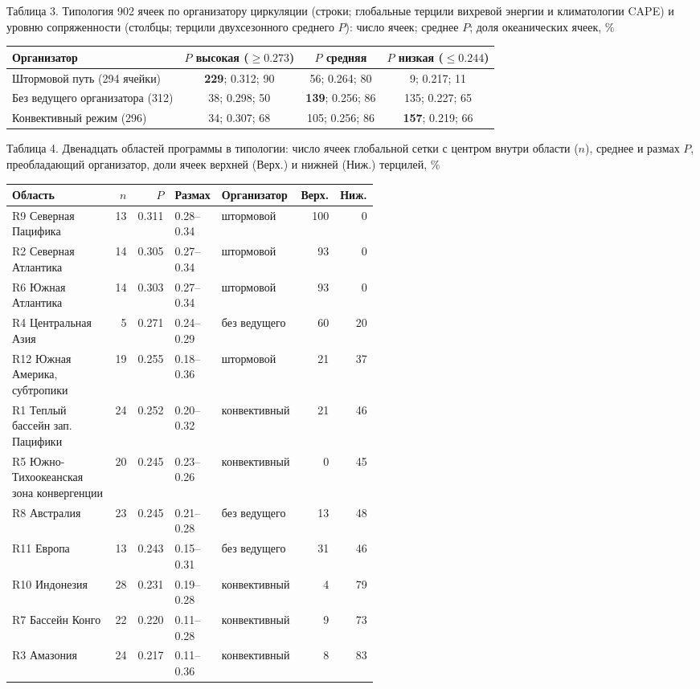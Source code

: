 \documentclass[12pt,a4paper]{article}
\begin{document}
\clearpage
\noindent Таблица 3. Типология 902 ячеек по организатору циркуляции (строки; глобальные терцили вихревой энергии и климатологии CAPE) и уровню сопряженности (столбцы; терцили двухсезонного среднего $P$): число ячеек; среднее $P$; доля океанических ячеек, \%

\begin{singlespace}
\noindent\begin{tabular}{@{}lccc@{}}
\toprule
Организатор & $P$ высокая ($\ge 0.273$) & $P$ средняя & $P$ низкая ($\le 0.244$)\\
\midrule
Штормовой путь (294 ячейки) & \textbf{229}; 0.312; 90 & 56; 0.264; 80 & 9; 0.217; 11\\
Без ведущего организатора (312) & 38; 0.298; 50 & \textbf{139}; 0.256; 86 & 135; 0.227; 65\\
Конвективный режим (296) & 34; 0.307; 68 & 105; 0.256; 86 & \textbf{157}; 0.219; 66\\
\bottomrule
\end{tabular}
\end{singlespace}

\clearpage
\noindent Таблица 4. Двенадцать областей программы в типологии: число ячеек глобальной сетки с центром внутри области ($n$), среднее и размах $P$, преобладающий организатор, доли ячеек верхней (Верх.) и нижней (Ниж.) терцилей, \%

\begin{singlespace}
\noindent\begin{tabular}{@{}>{\raggedright\arraybackslash}p{0.36\linewidth}rrl>{\raggedright\arraybackslash}p{0.17\linewidth}rr@{}}
\toprule
Область & $n$ & $P$ & Размах & Организатор & Верх. & Ниж.\\
\midrule
R9 Северная Пацифика & 13 & 0.311 & 0.28--0.34 & штормовой & 100 & 0\\
R2 Северная Атлантика & 14 & 0.305 & 0.27--0.34 & штормовой & 93 & 0\\
R6 Южная Атлантика & 14 & 0.303 & 0.27--0.34 & штормовой & 93 & 0\\
R4 Центральная Азия & 5 & 0.271 & 0.24--0.29 & без ведущего & 60 & 20\\
R12 Южная Америка, субтропики & 19 & 0.255 & 0.18--0.36 & штормовой & 21 & 37\\
R1 Теплый бассейн зап. Пацифики & 24 & 0.252 & 0.20--0.32 & конвективный & 21 & 46\\
R5 Южно-Тихоокеанская зона конвергенции & 20 & 0.245 & 0.23--0.26 & конвективный & 0 & 45\\
R8 Австралия & 23 & 0.245 & 0.21--0.28 & без ведущего & 13 & 48\\
R11 Европа & 13 & 0.243 & 0.15--0.31 & без ведущего & 31 & 46\\
R10 Индонезия & 28 & 0.231 & 0.19--0.28 & конвективный & 4 & 79\\
R7 Бассейн Конго & 22 & 0.220 & 0.11--0.28 & конвективный & 9 & 73\\
R3 Амазония & 24 & 0.217 & 0.11--0.36 & конвективный & 8 & 83\\
\bottomrule
\end{tabular}
\end{singlespace}
\end{document}
